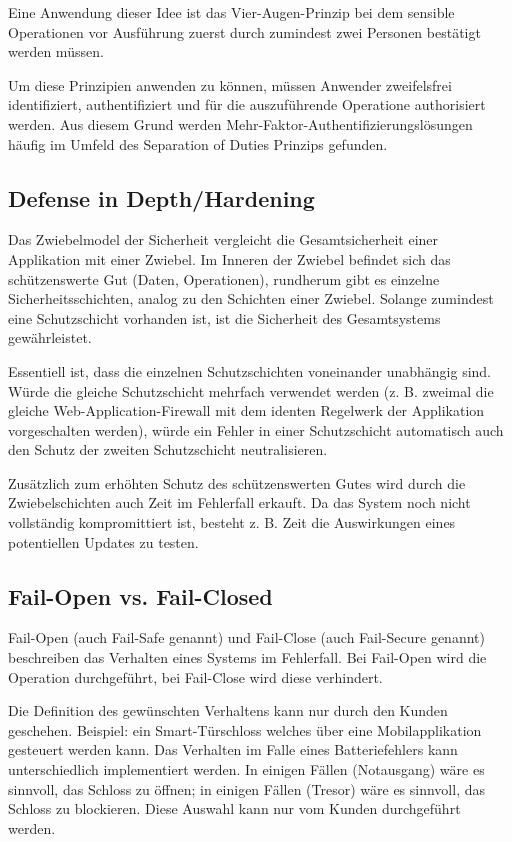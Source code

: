 Eine Anwendung dieser Idee ist das Vier-Augen-Prinzip bei dem sensible Operationen vor Ausführung zuerst durch zumindest zwei Personen bestätigt werden müssen.

Um diese Prinzipien anwenden zu können, müssen Anwender zweifelsfrei identifiziert, authentifiziert und für die auszuführende Operatione authorisiert werden. Aus diesem Grund werden Mehr-Faktor-Authentifizierungslösungen häufig im Umfeld des Separation of Duties Prinzips gefunden.

\subsection{Defense in Depth/Hardening}

Das Zwiebelmodel der Sicherheit vergleicht die Gesamtsicherheit einer Applikation mit einer Zwiebel. Im Inneren der Zwiebel befindet sich das schützenswerte Gut (Daten, Operationen), rundherum gibt es einzelne Sicherheitsschichten, analog zu den Schichten einer Zwiebel. Solange zumindest eine Schutzschicht vorhanden ist, ist die Sicherheit des Gesamtsystems gewährleistet.

Essentiell ist, dass die einzelnen Schutzschichten voneinander unabhängig sind. Würde die gleiche Schutzschicht mehrfach verwendet werden (z. B. zweimal die gleiche Web-Application-Firewall mit dem identen Regelwerk der Applikation vorgeschalten werden), würde ein Fehler in einer Schutzschicht automatisch auch den Schutz der zweiten Schutzschicht neutralisieren.

Zusätzlich zum erhöhten Schutz des schützenswerten Gutes wird durch die Zwiebelschichten auch Zeit im Fehlerfall erkauft. Da das System noch nicht vollständig kompromittiert ist, besteht z. B. Zeit die Auswirkungen eines potentiellen Updates zu testen.

\subsection{Fail-Open vs. Fail-Closed}

Fail-Open (auch Fail-Safe genannt) und Fail-Close (auch Fail-Secure genannt) beschreiben das Verhalten eines Systems im Fehlerfall. Bei Fail-Open wird die Operation durchgeführt, bei Fail-Close wird diese verhindert.

Die Definition des gewünschten Verhaltens kann nur durch den Kunden geschehen. Beispiel: ein Smart-Türschloss welches über eine Mobilapplikation gesteuert werden kann. Das Verhalten im Falle eines Batteriefehlers kann unterschiedlich implementiert werden. In einigen Fällen (Notausgang) wäre es sinnvoll, das Schloss zu öffnen; in einigen Fällen (Tresor) wäre es sinnvoll, das Schloss zu blockieren. Diese Auswahl kann nur vom Kunden durchgeführt werden.

